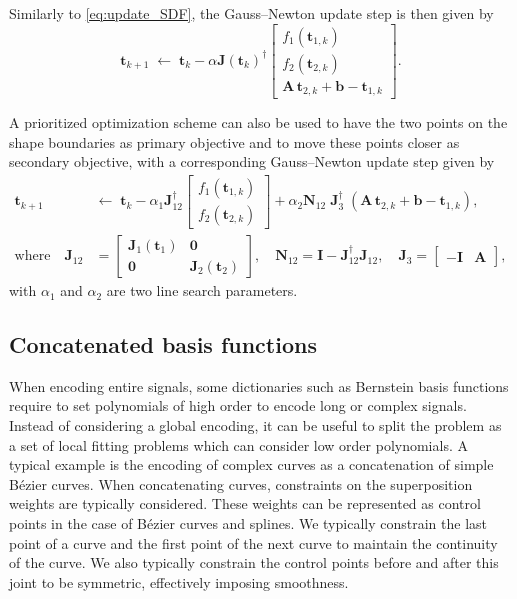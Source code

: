 \documentclass[10pt,a4paper]{article} %
\newcommand{\psin}{{\dagger}}
\begin{document}
Similarly to \eqref{eq:update_SDF}, the Gauss--Newton update step is then given by
\begin{equation}
	\bm{t}_{k+1} \;\leftarrow\; \bm{t}_k - \alpha \bm{J}(\bm{t}_k)^\psin 
	\begin{bmatrix} f_1(\bm{t}_{1,k}) \\ f_2(\bm{t}_{2,k}) \\ \bm{A} \, \bm{t}_{2,k} + \bm{b} - \bm{t}_{1,k} \end{bmatrix}.
\end{equation}

A prioritized optimization scheme can also be used to have the two points on the shape boundaries as primary objective and to move these points closer as secondary objective, with a corresponding Gauss--Newton update step given by
\begin{align}
	\bm{t}_{k+1} &\leftarrow\; \bm{t}_k - \alpha_1 \bm{J}_{12}^\psin \begin{bmatrix} f_1(\bm{t}_{1,k}) \\ f_2(\bm{t}_{2,k}) \end{bmatrix} 	
	+ \alpha_2 \bm{N}_{12} \; \bm{J}_{3}^\psin \; (\bm{A} \, \bm{t}_{2,k} + \bm{b} - \bm{t}_{1,k}), \\	
	\text{where}\quad
	\bm{J}_{12} &= \begin{bmatrix} \bm{J}_1(\bm{t}_1) & \bm{0} \\ \bm{0} & \bm{J}_2(\bm{t}_2) \end{bmatrix}, \quad
	\bm{N}_{12} = \bm{I} - \bm{J}_{12}^\psin \bm{J}_{12}, \quad
	\bm{J}_{3} = \begin{bmatrix} -\bm{I} & \bm{A} \end{bmatrix},
\end{align}
with $\alpha_1$ and $\alpha_2$ are two line search parameters.


\subsection{Concatenated basis functions}

When encoding entire signals, some dictionaries such as Bernstein basis functions require to set polynomials of high order to encode long or complex signals. Instead of considering a global encoding, it can be useful to split the problem as a set of local fitting problems which can consider low order polynomials. A typical example is the encoding of complex curves as a concatenation of simple Bézier curves. When concatenating curves, constraints on the superposition weights are typically considered. These weights can be represented as control points in the case of Bézier curves and splines. We typically constrain the last point of a curve and the first point of the next curve to maintain the continuity of the curve. We also typically constrain the control points before and after this joint to be symmetric, effectively imposing smoothness.
\end{document}
